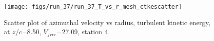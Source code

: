 \begin{figure}[H]
\centering
\texttt{[image: figs/run\_37/run\_37\_T\_vs\_r\_mesh\_ctkescatter]}
\caption{Scatter plot of azimuthal velocity vs radius, turbulent kinetic energy, at $z/c$=8.50, $V_{free}$=27.09, station 4.}
\label{fig:run_37_T_vs_r_mesh_ctkescatter}
\end{figure}


